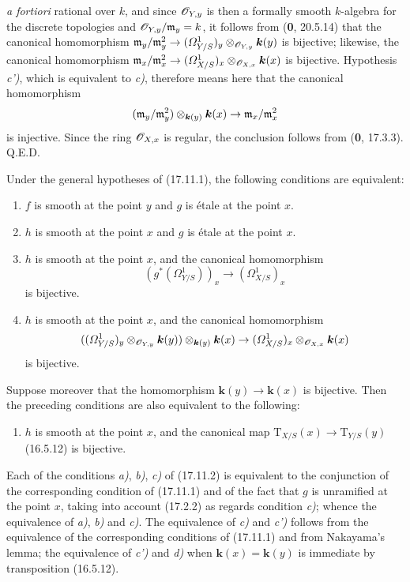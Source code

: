 
\emph{a fortiori} rational over $k$, and since $\mathscr{O}_{Y,y}$ is then a formally smooth $k$-algebra for the discrete topologies and $\mathscr{O}_{Y,y}/\mathfrak m_y=k$, it follows from (\textbf{0}, 20.5.14) that the canonical homomorphism $\mathfrak m_y/\mathfrak m_y^2\to(\varOmega^1_{Y/S})_y\otimes_{\mathscr{O}_{Y,y}}\boldsymbol{k}(y)$ is bijective; likewise, the canonical homomorphism $\mathfrak m_x/\mathfrak m_x^2\to(\varOmega^1_{X/S})_x\otimes_{\mathscr{O}_{X,x}}\boldsymbol{k}(x)$ is bijective. Hypothesis \emph{c')}, which is equivalent to \emph{c)}, therefore means here that the canonical homomorphism
\[
(\mathfrak m_y/\mathfrak m_y^2)\otimes_{\boldsymbol{k}(y)}\boldsymbol{k}(x)\to\mathfrak m_x/\mathfrak m_x^2
\]
is injective. Since the ring $\mathscr{O}_{X,x}$ is regular, the conclusion follows from (\textbf{0}, 17.3.3). Q.E.D.

\begin{corollary}[17.11.2]
\label{IV.17.11.2}
Under the general hypotheses of \textup{(17.11.1)}, the following conditions are equivalent:
\begin{enumerate}
  \item[\textup{a)}] $f$ is smooth at the point $y$ and $g$ is étale at the point $x$.
  \item[\textup{b)}] $h$ is smooth at the point $x$ and $g$ is étale at the point $x$.
  \item[\textup{c)}] $h$ is smooth at the point $x$, and the canonical homomorphism
  \[
  (g^*(\varOmega^1_{Y/S}))_x\to(\varOmega^1_{X/S})_x
  \]
  is bijective.
  \item[\textup{c$'$)}] $h$ is smooth at the point $x$, and the canonical homomorphism
  \[
  ((\varOmega^1_{Y/S})_y\otimes_{\mathscr{O}_{Y,y}}\boldsymbol{k}(y))\otimes_{\boldsymbol{k}(y)}\boldsymbol{k}(x)\to(\varOmega^1_{X/S})_x\otimes_{\mathscr{O}_{X,x}}\boldsymbol{k}(x)
  \]
  is bijective.
\end{enumerate}
Suppose moreover that the homomorphism $\boldsymbol{k}(y)\to\boldsymbol{k}(x)$ is bijective. Then the preceding conditions are also equivalent to the following:
\begin{enumerate}
  \item[\textup{d)}] $h$ is smooth at the point $x$, and the canonical map $\mathrm{T}_{X/S}(x)\to\mathrm{T}_{Y/S}(y)$ \textup{(16.5.12)} is bijective.
\end{enumerate}
\end{corollary}

Each of the conditions \emph{a)}, \emph{b)}, \emph{c)} of (17.11.2) is equivalent to the conjunction of the corresponding condition of (17.11.1) and of the fact that $g$ is unramified at the point $x$, taking into account (17.2.2) as regards condition \emph{c)}; whence the equivalence of \emph{a)}, \emph{b)} and \emph{c)}. The equivalence of \emph{c)} and \emph{c')} follows from the equivalence of the corresponding conditions of (17.11.1) and from Nakayama's lemma; the equivalence of \emph{c')} and \emph{d)} when $\boldsymbol{k}(x)=\boldsymbol{k}(y)$ is immediate by transposition (16.5.12).

